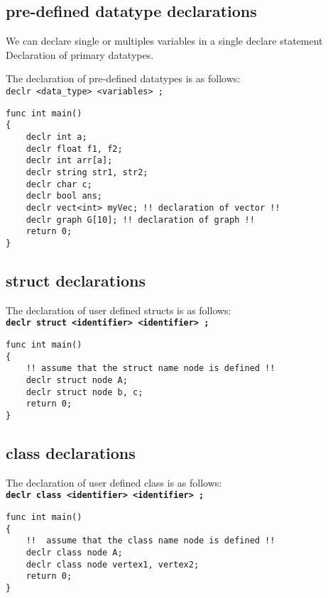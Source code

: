 \documentclass[journal, 18pt]{report}
\begin{document}
\subsection{pre-defined datatype declarations}
We can declare single or multiples variables in a single declare statement
Declaration of primary datatypes.

The declaration of pre-defined datatypes is as follows:\\
\texttt{declr <data\_type> <variables> ;}


\begin{lstlisting}
func int main()
{
    declr int a;
    declr float f1, f2;
    declr int arr[a];
    declr string str1, str2;
    declr char c;
    declr bool ans; 
    declr vect<int> myVec; !! declaration of vector !!
    declr graph G[10]; !! declaration of graph !!
    return 0;
}
\end{lstlisting}

\subsection{struct declarations}
The declaration of user defined structs is as follows:\\
\textbf{\texttt{declr struct <identifier> <identifier> ;}}
\begin{lstlisting}
func int main()
{
    !! assume that the struct name node is defined !!
    declr struct node A;
    declr struct node b, c;
    return 0;
}
\end{lstlisting}

\subsection{class declarations}
The declaration of user defined class is as follows:\\
\textbf{\texttt{declr class <identifier> <identifier> ;}}
\begin{lstlisting}
func int main()
{
    !!  assume that the class name node is defined !!
    declr class node A;
    declr class node vertex1, vertex2;
    return 0;
}
\end{lstlisting}
\end{document}
